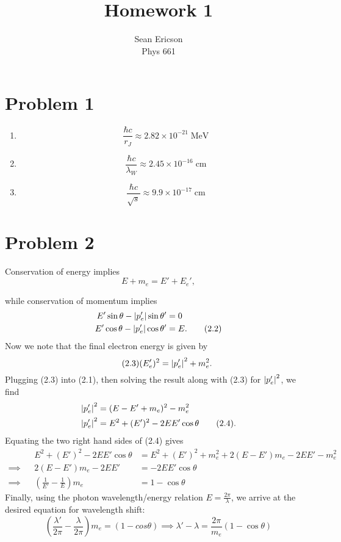 \documentclass[12pt]{article}
\begin{document}
\title{Homework 1}
\author{Sean Ericson \\ Phys 661}
\maketitle

\section*{Problem 1}
\begin{enumerate}[label=(\alph*)]
    \item \[ \frac{\hbar c}{r_J} \approx 2.82\times 10^{-21}\;\text{MeV} \]
    \item \[ \frac{\hbar c}{\lambda_W} \approx 2.45\times 10^{-16}\;\text{cm} \]
    \item \[ \frac{\hbar c}{\sqrt{s}} \approx 9.9\times 10^{-17}\;\text{cm} \]
\end{enumerate}


\section*{Problem 2}
Conservation of energy implies
\begin{equation*} \tag{2.1}
    E + m_e = E' + E_e',
\end{equation*}
    
while conservation of momentum implies
\begin{align*}
    E' \sin\theta - \abs{p_e'}\sin\theta' &= 0 \\
    E' \cos\theta - \abs{p_e'}\cos\theta' &= E. \tag{2.2}
\end{align*}
Now we note that the final electron energy is given by
\begin{equation*} \tag{2.3}
    (E_e')^2 = \abs{p_e'}^2 + m_e^2.
\end{equation*}
Plugging (2.3) into (2.1), then solving the result along with (2.3) for $\abs{p_e'}^2$, we find
\begin{align*}
    \abs{p_e'}^2 &= (E - E' + m_e)^2 - m_e^2 \\
    \abs{p_e'}^2 &= E^2 + (E')^2 - 2EE'\cos\theta \tag{2.4}.
\end{align*}
Equating the two right hand sides of (2.4) gives
\begin{align*}
    &&E^2 + (E')^2 - 2EE'\cos\theta &= E^2 + (E')^2 + m_e^2 + 2(E-E')m_e - 2EE' - m_e^2 \\
    \implies&& 2(E-E')m_e - 2EE' &= -2EE'\cos\theta \\
    \implies&& (\frac{1}{E'} - \frac{1}{E})m_e &= 1 - \cos\theta
\end{align*}
Finally, using the photon wavelength/energy relation $E = \frac{2\pi}{\lambda}$, we arrive at the desired equation for wavelength shift:
\[ (\frac{\lambda'}{2\pi} - \frac{\lambda}{2\pi})m_e = (1-cos\theta) \implies \boxed{\lambda' - \lambda = \frac{2\pi}{m_e}(1-\cos\theta)} \]
\end{document}
